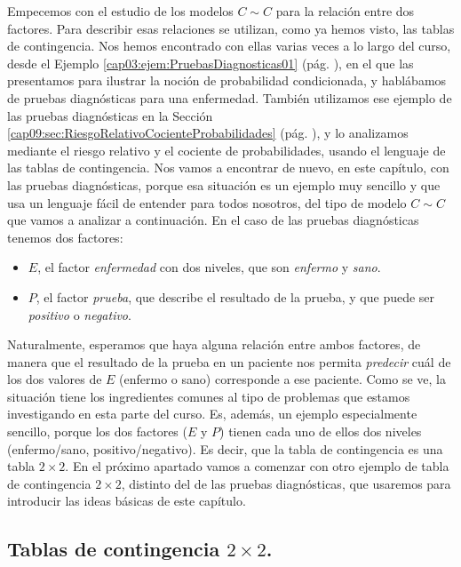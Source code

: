 Empecemos con el estudio de los modelos $C \sim C$ para la relación entre dos factores. Para describir esas relaciones se utilizan, como ya hemos visto,  las {\sf tablas de contingencia}. Nos hemos encontrado con ellas varias veces a lo largo del curso, desde el Ejemplo \ref{cap03:ejem:PruebasDiagnosticas01} (pág. \pageref{cap03:ejem:PruebasDiagnosticas01}), en el que las presentamos para ilustrar la noción de probabilidad condicionada, y hablábamos de pruebas diagnósticas para una enfermedad. También utilizamos ese ejemplo de las pruebas diagnósticas en la Sección \ref{cap09:sec:RiesgoRelativoCocienteProbabilidades} (pág. \pageref{cap09:sec:RiesgoRelativoCocienteProbabilidades}), y lo analizamos mediante el riesgo relativo y el cociente de probabilidades, usando el lenguaje de las tablas de contingencia. Nos vamos a encontrar de nuevo, en este capítulo, con las pruebas diagnósticas, porque esa situación es un ejemplo muy sencillo y que usa un lenguaje fácil de entender para todos nosotros, del tipo de modelo $C \sim C$ que vamos a analizar a continuación. En el caso de las pruebas diagnósticas tenemos dos factores:
\begin{itemize}
  \item $E$, el factor {\em enfermedad} con dos niveles, que son {\em enfermo} y {\em sano}.
  \item $P$, el factor {\em prueba}, que describe el resultado de la prueba, y que puede ser {\em positivo} o {\em negativo}.
\end{itemize}
Naturalmente, esperamos que haya alguna relación entre ambos factores, de manera que el resultado de la prueba en un paciente nos permita {\em predecir} cuál de los dos valores de $E$ (enfermo o sano) corresponde a ese paciente. Como se ve, la situación tiene los ingredientes comunes al tipo de problemas que estamos investigando en esta parte del curso. Es, además, un ejemplo especialmente sencillo, porque los dos factores ($E$ y $P$) tienen cada uno de ellos dos niveles (enfermo/sano, positivo/negativo). Es decir, que la tabla de contingencia es una tabla $2\times2$. En el próximo apartado vamos a comenzar con otro ejemplo de tabla de contingencia $2\times2$, distinto del de las pruebas diagnósticas, que usaremos para introducir las ideas básicas de este capítulo.

\subsection{Tablas de contingencia $2\times 2$.}
\label{cap12:subsec:TablasContingencia2x2}


